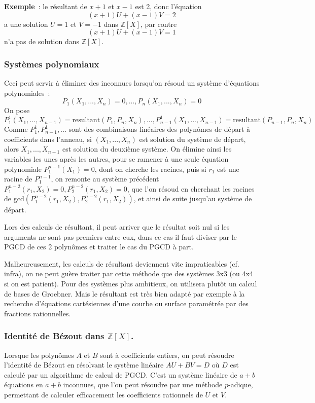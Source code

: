 \documentclass[a4paper,11pt]{article}
\begin{document}
\begin{giacjshere}
{\bf Exemple}~: le r\'esultant de $x+1$ et $x-1$ est 2, donc l'\'equation
$$ (x+1)U+(x-1)V=2$$ a une solution $U=1$ et $V=-1$ dans $\mathbb{Z}[X]$,
par contre $$ (x+1)U+(x-1)V=1$$ n'a pas de solution dans $\mathbb{Z}[X]$.

\subsubsection{Syst\`emes polynomiaux}
Ceci peut servir \`a \'eliminer des inconnues lorsqu'on r\'esoud un
syst\`eme d'\'equations polynomiales~:
$$ P_1(X_1,...,X_n)=0, ..., P_n(X_1,...,X_n)=0$$
On pose 
$$P^1_1(X_1,...,X_{n-1})=\mbox{resultant}(P_1,P_n,X_n), ..., 
P^1_{n-1}(X_1,...,X_{n-1})=\mbox{resultant}(P_{n-1},P_n,X_n)
$$
Comme $P^1_1, P^1_{n-1}, ...$ sont des combinaisons lin\'eaires des
polyn\^omes de d\'epart \`a coefficients dans l'anneau, si
$(X_1,...,X_n)$
est solution du syst\`eme de d\'epart, alors $X_1,...,X_{n-1}$
est solution du deuxi\`eme syst\`eme.
On \'elimine ainsi les variables les unes apr\`es les autres,
pour se ramener \`a une seule \'equation polynomiale $P^{n-1}_1(X_1)=0$, dont on
cherche les racines, puis si $r_1$ est une racine de $P^{n-1}_1$, on
remonte au syst\`eme pr\'ec\'edent $P^{n-2}_1(r_1,X_2)=0,
P^{n-2}_2(r_1,X_2)=0$, que l'on r\'esoud en cherchant
les racines de gcd$(P^{n-2}_1(r_1,X_2),P^{n-2}_2(r_1,X_2))$, et ainsi
de suite jusqu'au syst\`eme de d\'epart.

Lors des calculs de r\'esultant, il peut arriver que le r\'esultat
soit nul si les arguments ne sont pas premiers entre eux, dans
ce cas il faut diviser par le PGCD de ces 2 polyn\^omes et traiter le cas
du PGCD \`a part.

Malheureusement, les calculs de r\'esultant deviennent vite
impraticables (cf. infra), on ne peut gu\`ere traiter par cette m\'ethode
que des syst\`emes 3x3 (ou 4x4 si on est patient). Pour
des syst\`emes plus ambitieux, on utilisera plut\^ot un
calcul de bases de Groebner. Mais le r\'esultant est tr\`es bien
adapt\'e par exemple \`a la recherche d'\'equations cart\'esiennes
d'une courbe ou surface param\'etr\'ee par des fractions rationnelles.

\subsubsection{Identit\'e de B\'ezout dans $\mathbb{Z}[X]$.}
Lorsque les polyn\^omes $A$ et $B$ sont \`a coefficients entiers,
on peut r\'esoudre l'identit\'e de B\'ezout en r\'esolvant le
syst\`eme lin\'eaire $AU+BV=D$ o\`u $D$ est calcul\'e par
un algorithme de calcul de PGCD. C'est un syst\`eme lin\'eaire
de $a+b$ \'equations en $a+b$ inconnues, que l'on peut r\'esoudre
par une m\'ethode $p$-adique, permettant de calculer efficacement
les coefficients rationnels de $U$ et $V$.


\end{giacjshere}
\end{document}
